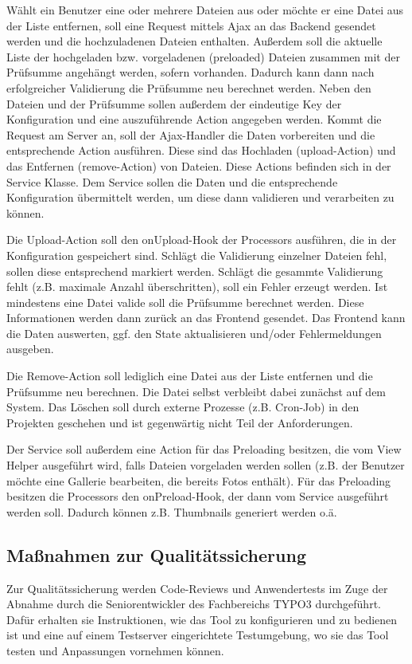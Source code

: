Wählt ein Benutzer eine oder mehrere Dateien aus oder möchte er eine Datei aus der Liste entfernen, soll eine Request mittels Ajax an das Backend gesendet werden und die hochzuladenen Dateien enthalten. Außerdem soll die aktuelle Liste der hochgeladen bzw. vorgeladenen (preloaded) Dateien zusammen mit der Prüfsumme angehängt werden, sofern vorhanden. Dadurch kann dann nach erfolgreicher Validierung die Prüfsumme neu berechnet werden. Neben den Dateien und der Prüfsumme sollen außerdem der eindeutige Key der Konfiguration und eine auszuführende Action angegeben werden. Kommt die Request am Server an, soll der Ajax-Handler die Daten vorbereiten und die entsprechende Action ausführen. Diese sind das Hochladen (upload-Action) und das Entfernen (remove-Action) von Dateien. Diese Actions befinden sich in der Service Klasse. Dem Service sollen die Daten und die entsprechende Konfiguration übermittelt werden, um diese dann validieren und verarbeiten zu können.

Die Upload-Action soll den onUpload-Hook der Processors ausführen, die in der Konfiguration gespeichert sind. Schlägt die Validierung einzelner Dateien fehl, sollen diese entsprechend markiert werden. Schlägt die gesammte Validierung fehlt (z.B. maximale Anzahl überschritten), soll ein Fehler erzeugt werden. Ist mindestens eine Datei valide soll die Prüfsumme berechnet werden. Diese Informationen werden dann zurück an das Frontend gesendet. Das Frontend kann die Daten auswerten, ggf. den State aktualisieren und/oder Fehlermeldungen ausgeben.

Die Remove-Action soll lediglich eine Datei aus der Liste entfernen und die Prüfsumme neu berechnen. Die Datei selbst verbleibt dabei zunächst auf dem System. Das Löschen soll durch externe Prozesse (z.B. Cron-Job) in den Projekten geschehen und ist gegenwärtig nicht Teil der Anforderungen.

Der Service soll außerdem eine Action für das Preloading besitzen, die vom View Helper ausgeführt wird, falls Dateien vorgeladen werden sollen (z.B. der Benutzer möchte eine Gallerie bearbeiten, die bereits Fotos enthält). Für das Preloading besitzen die Processors den onPreload-Hook, der dann vom Service ausgeführt werden soll. Dadurch können z.B. Thumbnails generiert werden o.ä.

\subsection{Maßnahmen zur Qualitätssicherung}

Zur Qualitätssicherung werden Code-Reviews und Anwendertests im Zuge der Abnahme durch die Seniorentwickler des Fachbereichs TYPO3 durchgeführt. Dafür erhalten sie Instruktionen, wie das Tool zu konfigurieren und zu bedienen ist und eine auf einem Testserver eingerichtete Testumgebung, wo sie das Tool testen und Anpassungen vornehmen können.